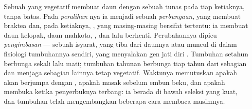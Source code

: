 \begin{definition}\label{def:b2:plant-flowering:transition}
Sebuah  yang vegetatif membuat daun dengan sebuah
tunas pada tiap ketiaknya, tanpa batas. Pada \emph{peralihan }nya
ia menjadi sebuah \emph{ perbungaan}, yang membuat braktea dan,
pada ketiaknya, \emph{ }, yang masing-masing bersifat
tertentu: ia membuat daun kelopak, daun mahkota, , dan  lalu berhenti. Perubahannya dipicu \emph{pengimbasan } ---
sebuah isyarat, yang tiba dari daunnya atau muncul di dalam fisiologi
tumbuhannya sendiri, yang menyalakan gen jati diri .
Tumbuhan setahun berbunga sekali lalu mati; tumbuhan tahunan berbunga
tiap tahun dari sebagian  dan menjaga sebagian lainnya tetap
vegetatif. Waktunya memutuskan apakah  akan berjumpa dengan
, apakah  masak sebelum embun beku, dan apakah  membuka
ketika penyerbuknya terbang: ia berada di bawah seleksi yang kuat, dan
tumbuhan telah mengembangkan beberapa cara membaca musimnya.
\end{definition}

